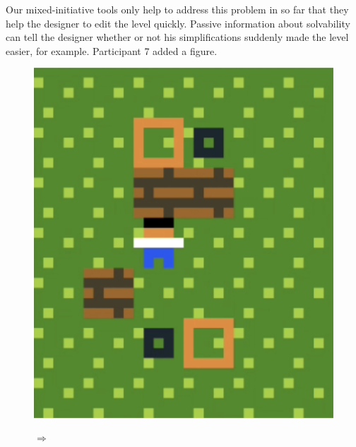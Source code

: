\begin{description}
Our mixed-initiative tools only help to address this problem in so far that they help the designer to edit the level quickly. Passive information about solvability can tell the designer whether or not his simplifications suddenly made the level easier, for example. Participant 7 added a figure.

\begin{figure}[!htbp]
\centering
\begin{minipage}[t]{0.25\textwidth}
\includegraphics[width=\textwidth]{figures/windowdressingpart71.png} \hfill \\
\end{minipage}
$\Longrightarrow$
\begin{minipage}[t]{0.25\textwidth}

\end{minipage}
\end{figure}
\end{description}

